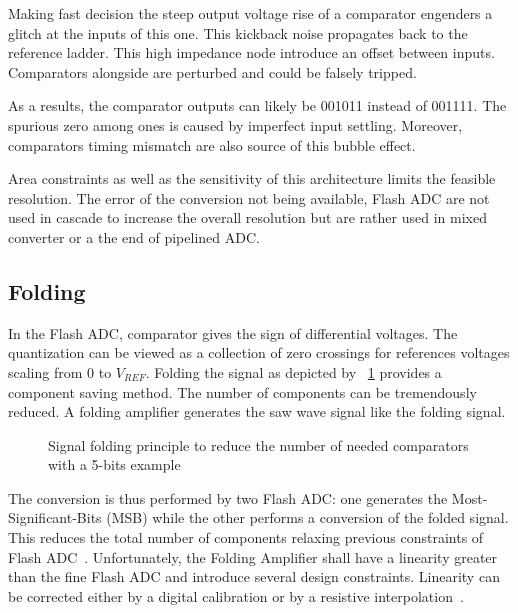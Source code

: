 Making fast decision the steep output voltage rise of a comparator engenders a glitch at the inputs of this one. This kickback noise propagates back to the reference ladder. This high impedance node introduce an offset between inputs. Comparators alongside are perturbed and could be falsely tripped.

As a results, the comparator outputs can likely be 001011 instead of 001111. The spurious zero among ones is caused by imperfect input settling. Moreover, comparators timing mismatch are also source of this bubble effect.

Area constraints as well as the sensitivity of this architecture limits the feasible resolution. The error of the conversion not being available, Flash ADC are not used in cascade to increase the overall resolution but are rather used in mixed converter or a the end of pipelined ADC\@.




	\subsection{Folding}                           %
	\label{sec:folding-adc}
In the Flash ADC, comparator gives the sign of differential voltages. The quantization can be viewed as a collection of zero crossings for references voltages scaling from 0 to \(V_{REF} \). Folding the signal as depicted by \figurename~\ref{fig:folding_principle} provides a component saving method. The number of components can be tremendously reduced. A folding amplifier generates the saw wave signal like the folding signal.

\begin{figure}[htp]
	\centering
	\resizebox{0.8\textwidth}{!} {}
	\caption{Signal folding principle to reduce the number of needed comparators with a 5-bits example}
	\label{fig:folding_principle}
\end{figure}

The conversion is thus performed by two Flash ADC\@: one generates the Most-Significant-Bits (MSB) while the other performs a conversion of the folded signal. This reduces the total number of components relaxing previous constraints of Flash ADC~\cite{VanDePlassche1979, Grift1987, Nauta1995, Vorenkamp1997}. Unfortunately, the Folding Amplifier shall have a linearity greater than the fine Flash ADC and introduce several design constraints. Linearity can be corrected either by a digital calibration or by a resistive interpolation~\cite{Vorenkamp1997}.

